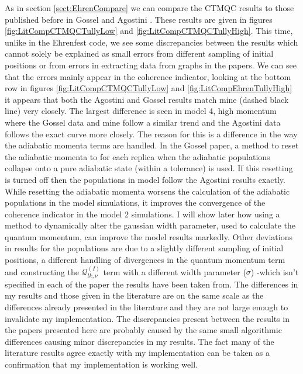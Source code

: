 As in section \ref{sect:EhrenCompare} we can compare the CTMQC results to those published before in Gossel \cite{gossel_coupled-trajectory_2018} and Agostini \cite{agostini_quantum-classical_2016}. These results are given in figures \ref{fig:LitCompCTMQCTullyLow} and \ref{fig:LitCompCTMQCTullyHigh}. This time, unlike in the Ehrenfest code, we see some discrepancies between the  results which cannot solely be explained as small errors from different sampling of initial positions or from errors in extracting data from graphs in the papers. We can see that the errors mainly appear in the coherence indicator, looking at the bottom row in figures \ref{fig:LitCompCTMQCTullyLow} and \ref{fig:LitCompEhrenTullyHigh} it appears that both the Agostini and Gossel results match mine (dashed black line) very closely. The largest difference is seen in model 4, high momentum where the Gossel data and mine follow a similar trend and the Agostini data follows the exact curve more closely. The reason for this is a difference in the way the adiabatic momenta terms are handled. In the Gossel paper,  a method to reset the adiabatic momenta to  for each replica when the adiabatic populations collapse onto a pure adiabatic state (within a tolerance) is used. If this resetting is turned off then the populations in model  follow the Agostini results exactly. While resetting the adiabatic momenta worsens the calculation of the adiabatic populations in the model  simulations, it improves the convergence of the coherence indicator in the model 2 simulations. I will show later how using a method to dynamically alter the gaussian width parameter, used to calculate the quantum momentum, can improve the model  results markedly. Other deviations in results for the populations are due to a slightly different sampling of initial positions, a different handling of divergences in the quantum momentum term and constructing the $\mathcal{Q}_{lk, \nu}^{(I)}$ term with a different width parameter ($\sigma$) -which isn't specified in each of the paper the results have been taken from. The differences in my results and those given in the literature are on the same scale as the differences already presented in the literature and they are not large enough to invalidate my implementation. The discrepancies present between the results in the papers presented here are probably caused by the same small algorithmic differences causing minor discrepancies in my results. The fact many of the literature results agree exactly with my implementation can be taken as a confirmation that my implementation is working well. 

